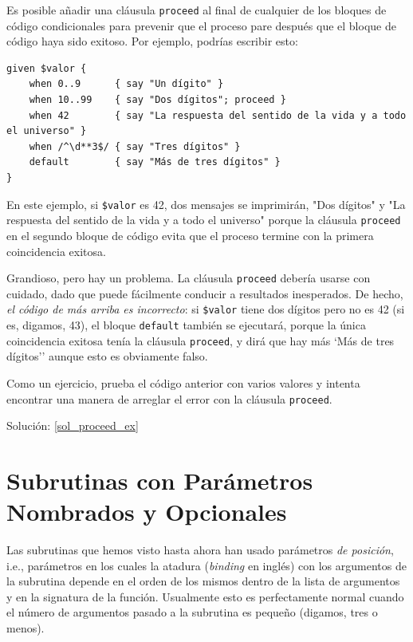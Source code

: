 Es posible añadir una cláusula {\tt proceed} al final de cualquier de los
bloques de código condicionales para prevenir que el proceso pare
después que el bloque de código haya sido exitoso. Por ejemplo, podrías 
escribir esto:

\begin{verbatim}
given $valor {
    when 0..9      { say "Un dígito" }
    when 10..99    { say "Dos dígitos"; proceed }
    when 42        { say "La respuesta del sentido de la vida y a todo el universo" }
    when /^\d**3$/ { say "Tres dígitos" }
    default        { say "Más de tres dígitos" }
}
\end{verbatim}

En este ejemplo, si \verb|$valor| es 42, dos mensajes se imprimirán,
"Dos dígitos" y "La respuesta del sentido de la vida y a todo el universo"
porque la cláusula {\tt proceed} en el segundo bloque de código 
evita que el proceso termine con la primera coincidencia exitosa.

Grandioso, pero hay un problema. La cláusula {\tt proceed} debería usarse
con cuidado, dado que puede fácilmente conducir a resultados inesperados.
De hecho, \emph{el código de más arriba es incorrecto}: si \verb|$valor| tiene
dos dígitos pero no es 42 (si es, digamos, 43), el bloque {\tt default} 
también se ejecutará, porque la única coincidencia exitosa tenía la cláusula
{\tt proceed}, y dirá que hay más `Más de tres dígitos'' aunque esto es
obviamente falso.

\label{proceed_ex}
Como un ejercicio, prueba el código anterior con varios valores y
intenta encontrar una manera de arreglar el error con la cláusula {\tt proceed}.

Solución: \ref{sol_proceed_ex}

\section{Subrutinas con Parámetros Nombrados y Opcionales}

Las subrutinas que hemos visto hasta ahora han usado parámetros
\emph{de posición}, i.e., parámetros en los cuales la atadura (\emph{binding} en inglés) 
con los argumentos de la subrutina depende en el orden de los mismos
dentro de la lista de argumentos y en la signatura de la función. 
Usualmente esto es perfectamente normal cuando el número de argumentos
pasado a la subrutina es pequeño (digamos, tres o menos).

